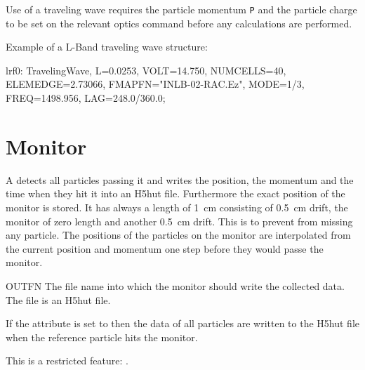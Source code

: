 \noindent Use of a traveling wave requires the particle momentum \texttt{P}
and the particle charge  to be set on the relevant
optics command before any calculations are performed.

Example of a L-Band traveling wave structure:
\begin{example}
lrf0: TravelingWave, L=0.0253, VOLT=14.750,
      NUMCELLS=40, ELEMEDGE=2.73066,
      FMAPFN="INLB-02-RAC.Ez", MODE=1/3,
      FREQ=1498.956, LAG=248.0/360.0;
\end{example}




\clearpage
\section{Monitor}
\label{sec:monitor}
 A  detects all particles passing it and writes the position, the momentum and the time when they hit it into an H5hut file. Furthermore the exact position of the monitor is stored. It has always a length of \SI{1}{\centi\meter} consisting of \SI{0.5}{\centi\meter} drift, the monitor of zero length and another \SI{0.5}{\centi\meter} drift. This is to prevent \opalt from missing any particle. The positions of the particles on the monitor are interpolated from the current position and momentum one step before they would passe the monitor.
\begin{kdescription}
\item[OUTFN]
  The file name into which the monitor should write the collected data. The file is an H5hut file.
\end{kdescription}

If the attribute  is set to  then the data of all particles are written to the H5hut file when the reference particle hits the monitor.

This is a restricted feature:  \noopalcycl.



